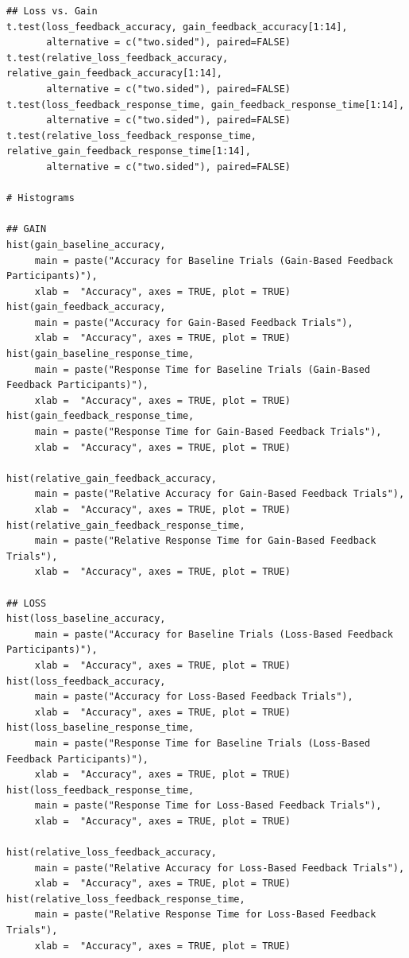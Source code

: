 \documentclass[12pt]{exam}
\begin{document}
\begin{verbatim}
## Loss vs. Gain
t.test(loss_feedback_accuracy, gain_feedback_accuracy[1:14], 
       alternative = c("two.sided"), paired=FALSE)
t.test(relative_loss_feedback_accuracy, relative_gain_feedback_accuracy[1:14], 
       alternative = c("two.sided"), paired=FALSE)
t.test(loss_feedback_response_time, gain_feedback_response_time[1:14], 
       alternative = c("two.sided"), paired=FALSE)
t.test(relative_loss_feedback_response_time, relative_gain_feedback_response_time[1:14], 
       alternative = c("two.sided"), paired=FALSE)

# Histograms

## GAIN
hist(gain_baseline_accuracy, 
     main = paste("Accuracy for Baseline Trials (Gain-Based Feedback Participants)"),
     xlab =  "Accuracy", axes = TRUE, plot = TRUE)
hist(gain_feedback_accuracy, 
     main = paste("Accuracy for Gain-Based Feedback Trials"),
     xlab =  "Accuracy", axes = TRUE, plot = TRUE)
hist(gain_baseline_response_time, 
     main = paste("Response Time for Baseline Trials (Gain-Based Feedback Participants)"),
     xlab =  "Accuracy", axes = TRUE, plot = TRUE)
hist(gain_feedback_response_time, 
     main = paste("Response Time for Gain-Based Feedback Trials"),
     xlab =  "Accuracy", axes = TRUE, plot = TRUE)

hist(relative_gain_feedback_accuracy, 
     main = paste("Relative Accuracy for Gain-Based Feedback Trials"),
     xlab =  "Accuracy", axes = TRUE, plot = TRUE)
hist(relative_gain_feedback_response_time, 
     main = paste("Relative Response Time for Gain-Based Feedback Trials"),
     xlab =  "Accuracy", axes = TRUE, plot = TRUE)

## LOSS
hist(loss_baseline_accuracy, 
     main = paste("Accuracy for Baseline Trials (Loss-Based Feedback Participants)"),
     xlab =  "Accuracy", axes = TRUE, plot = TRUE)
hist(loss_feedback_accuracy, 
     main = paste("Accuracy for Loss-Based Feedback Trials"),
     xlab =  "Accuracy", axes = TRUE, plot = TRUE)
hist(loss_baseline_response_time, 
     main = paste("Response Time for Baseline Trials (Loss-Based Feedback Participants)"),
     xlab =  "Accuracy", axes = TRUE, plot = TRUE)
hist(loss_feedback_response_time, 
     main = paste("Response Time for Loss-Based Feedback Trials"),
     xlab =  "Accuracy", axes = TRUE, plot = TRUE)

hist(relative_loss_feedback_accuracy, 
     main = paste("Relative Accuracy for Loss-Based Feedback Trials"),
     xlab =  "Accuracy", axes = TRUE, plot = TRUE)
hist(relative_loss_feedback_response_time, 
     main = paste("Relative Response Time for Loss-Based Feedback Trials"),
     xlab =  "Accuracy", axes = TRUE, plot = TRUE)



\end{verbatim}
\end{document}
